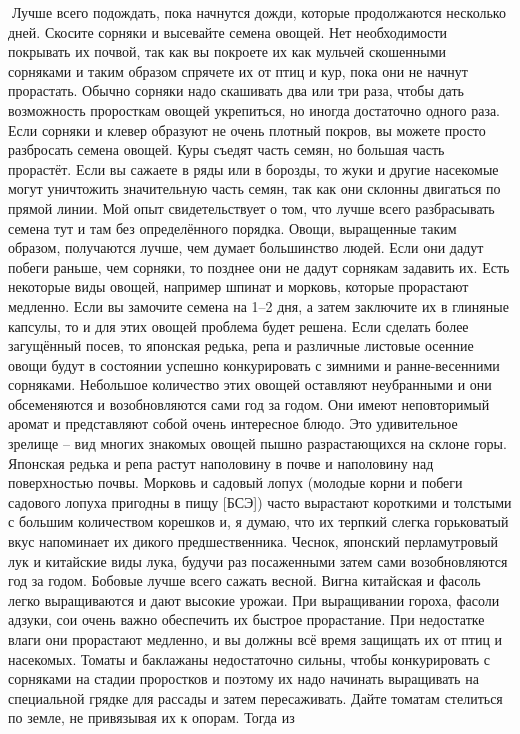 \documentclass[a4paper]{book}
\begin{document}
Лучше всего подождать, пока начнутся дожди, которые продолжаются несколько дней.
Скосите сорняки и высевайте семена овощей. Нет необходимости покрывать их почвой, так
как вы покроете их как мульчей скошенными сорняками и таким образом спрячете их от
птиц и кур, пока они не начнут прорастать. Обычно сорняки надо скашивать два или три
раза, чтобы дать возможность проросткам овощей укрепиться, но иногда достаточно одного
раза.
Если сорняки и клевер образуют не очень плотный покров, вы можете просто
разбросать семена овощей. Куры съедят часть семян, но большая часть прорастёт. Если вы
сажаете в ряды или в борозды, то жуки и другие насекомые могут уничтожить значительную
часть семян, так как они склонны двигаться по прямой линии. Мой опыт свидетельствует о
том, что лучше всего разбрасывать семена тут и там без определённого порядка.
Овощи, выращенные таким образом, получаются лучше, чем думает большинство людей.
Если они дадут побеги раньше, чем сорняки, то позднее они не дадут сорнякам задавить их.
Есть некоторые виды овощей, например шпинат и морковь, которые прорастают медленно.
Если вы замочите семена на 1–2 дня, а затем заключите их в глиняные капсулы, то и для
этих овощей проблема будет решена.
Если сделать более загущённый посев, то японская редька, репа и различные листовые
осенние овощи будут в состоянии успешно конкурировать с зимними и ранне-весенними
сорняками. Небольшое количество этих овощей оставляют неубранными и они
обсеменяются и возобновляются сами год за годом. Они имеют неповторимый аромат и
представляют собой очень интересное блюдо.
Это удивительное зрелище – вид многих знакомых овощей пышно разрастающихся на
склоне горы. Японская редька и репа растут наполовину в почве и наполовину над
поверхностью почвы. Морковь и садовый лопух (молодые корни и побеги садового лопуха
пригодны в пищу [БСЭ]) часто вырастают короткими и толстыми с большим количеством
корешков и, я думаю, что их терпкий слегка горьковатый вкус напоминает их дикого
предшественника. Чеснок, японский перламутровый лук и китайские виды лука, будучи раз
посаженными затем сами возобновляются год за годом.
Бобовые лучше всего сажать весной. Вигна китайская и фасоль легко выращиваются и
дают высокие урожаи. При выращивании гороха, фасоли адзуки, сои очень важно обеспечить
их быстрое прорастание. При недостатке влаги они прорастают медленно, и вы должны всё
время защищать их от птиц и насекомых.
Томаты и баклажаны недостаточно сильны, чтобы конкурировать с сорняками на стадии
проростков и поэтому их надо начинать выращивать на специальной грядке для рассады и
затем пересаживать. Дайте томатам стелиться по земле, не привязывая их к опорам. Тогда из
\end{document}

